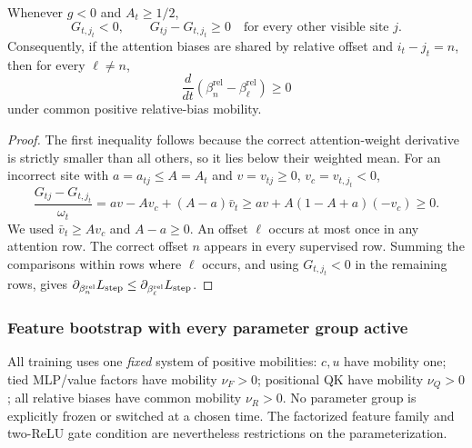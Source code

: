 \begin{lrlemma}
\label{lem:lr-postrouting-gradient}
Whenever $g<0$ and $A_t\ge1/2$,
\begin{equation}\label{eq:lr-score-comparison}
 G_{t,j_t}<0,\qquad G_{tj}-G_{t,j_t}\ge0
 \quad\text{for every other visible site }j.
\end{equation}
Consequently, if the attention biases are shared by relative offset and
$i_t-j_t=n$, then for every $\ell\ne n$,
\begin{equation}\label{eq:lr-bias-gap-mono}
 \frac{d}{dt}
 (\beta_n^{\mathrm{rel}}-\beta_\ell^{\mathrm{rel}})\ge0
\end{equation}
under common positive relative-bias mobility.
\end{lrlemma}
\begin{proof}
The first inequality follows because the correct attention-weight
derivative is strictly smaller than all others, so it lies below their
weighted mean.  For an incorrect site with $a=a_{tj}\le A=A_t$ and
$v=v_{tj}\ge0$, $v_c=v_{t,j_t}<0$,
\[
 \frac{G_{tj}-G_{t,j_t}}{\omega_t}
 =av-Av_c+(A-a)\bar v_t
 \ge av+A(1-A+a)(-v_c)\ge0.
\]
We used $\bar v_t\ge Av_c$ and $A-a\ge0$.
An offset $\ell$ occurs at most once in any attention row.  The correct
offset $n$ appears in every supervised row.  Summing the comparisons
within rows where $\ell$ occurs, and using $G_{t,j_t}<0$ in the
remaining rows, gives
$\partial_{\beta_n^{\mathrm{rel}}}L_{\mathrm{step}}
\le\partial_{\beta_\ell^{\mathrm{rel}}}L_{\mathrm{step}}$.
\end{proof}

\subsubsection{Feature bootstrap with every parameter group active}
\label{app:weak-routing-bootstrap}

All training uses one \emph{fixed} system of positive mobilities:
$c,u$ have mobility one; tied MLP/value factors have mobility
$\nu_F>0$; positional QK have mobility $\nu_Q>0$; all relative biases
have common mobility $\nu_R>0$.
No parameter group is explicitly frozen or switched at a chosen time.
The factorized feature family and two-ReLU gate condition are nevertheless
restrictions on the parameterization.

